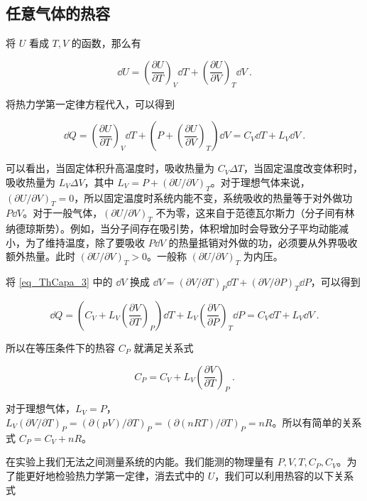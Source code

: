 \subsection{任意气体的热容}
将 $U$ 看成 $T,V$ 的函数，那么有

\begin{equation}
\dd U=\left(\frac{\partial U}{\partial T}\right)_V\dd T+\left(\frac{\partial U}{\partial V}\right)_T\dd V~.
\end{equation}

将热力学第一定律方程代入，可以得到

\begin{equation}\label{eq_ThCapa_3}
\dd Q=\left(\frac{\partial U}{\partial T}\right)_V\dd T+\left(P+\left(\frac{\partial U}{\partial V}\right)_T\right)\dd V
=C_V \dd T+L_V \dd V ~.
\end{equation}

可以看出，当固定体积升高温度时，吸收热量为 $C_V\Delta T$，当固定温度改变体积时，吸收热量为 $L_V\Delta V$，其中 $L_V=P+(\partial U/\partial V)_T$。对于理想气体来说， $(\partial U/\partial V)_T=0$，所以固定温度时系统内能不变，系统吸收的热量等于对外做功 $P\dd V$。对于一般气体，$(\partial U/\partial V)_T$ 不为零，这来自于范德瓦尔斯力（分子间有林纳德琼斯势）。例如，当分子间存在吸引势，体积增加时会导致分子平均动能减小，为了维持温度，除了要吸收 $P\dd V$ 的热量抵销对外做的功，必须要从外界吸收额外热量。此时 $(\partial U/\partial V)_T>0$。一般称 $(\partial U/\partial V)_T$ 为内压。

将 \autoref{eq_ThCapa_3} 中的 $\dd V$ 换成 $\dd V=(\partial V/\partial T)_P\dd T+(\partial V/\partial P)_T\dd P$，可以得到

\begin{equation}
\dd Q=\left(C_V+L_V\left(\frac{\partial V}{\partial T}\right)_P\right)\dd T+L_V\left(\frac{\partial V}{\partial P}\right)_T\dd P
=C_V \dd T+L_V \dd V ~.
\end{equation}

所以在等压条件下的热容 $C_P$ 就满足关系式

\begin{equation}
C_P=C_V+L_V\left(\frac{\partial V}{\partial T}\right)_P~.
\end{equation}

对于理想气体，$L_V=P$，$L_V(\partial V/\partial T)_P=(\partial (pV)/\partial T)_P=(\partial (nRT)/\partial T)_P=nR$。所以有简单的关系式 $C_P=C_V+nR$。

在实验上我们无法之间测量系统的内能。我们能测的物理量有 $P,V,T,C_P,C_V$。为了能更好地检验热力学第一定律，消去式中的 $U$，我们可以利用热容的以下关系式

